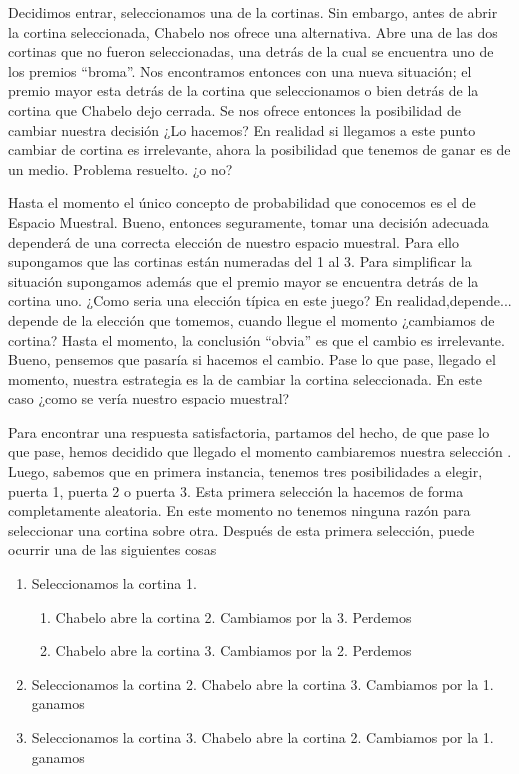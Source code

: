 \documentclass[14pt]{extreport}
\begin{document}
Decidimos entrar, seleccionamos una de la cortinas. Sin embargo, antes de abrir la cortina seleccionada, Chabelo nos ofrece una alternativa. Abre una de las dos cortinas que no fueron seleccionadas, una detrás de la cual se encuentra uno de los premios ``broma''. Nos encontramos entonces con una nueva situación; el premio mayor esta detrás de la cortina que seleccionamos o bien detrás de la cortina que Chabelo dejo cerrada. Se nos ofrece entonces la posibilidad de cambiar nuestra
decisión ¿Lo hacemos? En realidad si llegamos a este punto cambiar de cortina es irrelevante,  ahora la posibilidad que tenemos de ganar es de un medio. Problema resuelto. ¿o no?

Hasta el momento el único concepto de probabilidad que conocemos es el de Espacio Muestral. Bueno, entonces seguramente, tomar una decisión adecuada dependerá de una correcta elección de nuestro espacio muestral. Para ello supongamos que las cortinas están numeradas del 1 al 3. Para simplificar la situación supongamos además que el
premio mayor se encuentra detrás de la cortina uno. ¿Como seria una elección típica en este juego? En realidad,depende... depende de la elección que tomemos, cuando llegue el momento ¿cambiamos de cortina? Hasta el momento, la conclusión ``obvia'' es que el cambio es
irrelevante. Bueno, pensemos que pasaría si hacemos el cambio. Pase lo que pase, llegado el momento, nuestra estrategia es la de cambiar la cortina seleccionada. En este caso ¿como se vería nuestro espacio muestral?


Para encontrar una respuesta satisfactoria, partamos
del hecho, de que pase lo que pase, hemos decidido que llegado el momento cambiaremos nuestra
selección . Luego, sabemos que en primera instancia,
tenemos tres posibilidades a elegir, puerta 1, puerta 2 o puerta 3. Esta
primera selección la hacemos de forma completamente aleatoria. En este
momento no tenemos ninguna razón para seleccionar una cortina sobre
otra. Después de esta primera selección, puede ocurrir una de las siguientes cosas

\begin{enumerate}
	\item Seleccionamos la cortina 1. 
	\begin{enumerate}
		\item Chabelo abre la cortina 2. Cambiamos por la 3. Perdemos
		\item Chabelo abre la
cortina 3. Cambiamos por la 2. Perdemos
	\end{enumerate}
	\item Seleccionamos la cortina 2. Chabelo abre la cortina 3. Cambiamos por la
1. ganamos
	\item Seleccionamos la cortina 3. Chabelo abre la cortina 2. Cambiamos por la
1. ganamos
\end{enumerate}
 
\end{document}
